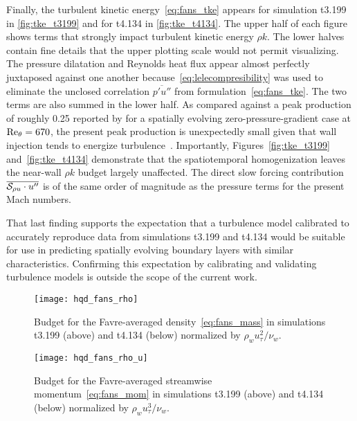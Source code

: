 Finally, the turbulent kinetic energy~\eqref{eq:fans_tke} appears for simulation
t3.199 in \autoref{fig:tke_t3199} and for t4.134 in \autoref{fig:tke_t4134}.
The upper half of each figure shows terms that strongly impact turbulent kinetic
energy $\rho k$.  The lower halves contain fine details that the upper plotting scale
would not permit visualizing.  The pressure dilatation and Reynolds heat
flux appear almost perfectly juxtaposed against one another because~\eqref{eq:lelecompresibility} was
used to eliminate the unclosed correlation $\overline{p'u''}$ from
formulation~\eqref{eq:fans_tke}.  The two terms are also summed in the lower
half.  As compared against a peak production of roughly 0.25 reported by
\citet{Schlatter2009Turbulent} for a spatially evolving zero-pressure-gradient
case at $\Reynolds[\theta]{}=670$, the present peak production is unexpectedly small
given that wall injection tends to energize
turbulence~\citep{Sumitani1995Direct}.
%
Importantly, Figures~\ref{fig:tke_t3199} and~\ref{fig:tke_t4134} demonstrate
that the \citet{Topalian2014Spatiotemporal} spatiotemporal homogenization
leaves the near-wall $\rho k$ budget largely unaffected.  The direct slow forcing
contribution $\overline{\Ssd_{\rho u}\cdot{}u^{\prime\prime}}$ is of the same
order of magnitude as the pressure terms for the present Mach numbers.

That last finding supports the expectation that a turbulence model calibrated to
accurately reproduce data from simulations t3.199 and t4.134 would be suitable
for use in predicting spatially evolving boundary layers with similar
characteristics.  Confirming this expectation by calibrating and validating
turbulence models is outside the scope of the current work.


\begin{figure}
\centering
\texttt{[image: hqd\_fans\_rho]}
\caption[Density equation budget for simulations t3.199 and t4.134]{%
    Budget for the Favre-averaged density~\eqref{eq:fans_mass}
    in simulations t3.199 (above) and t4.134 (below)
    normalized by $\rho_w u_\tau^2 / \nu_w$.\label{fig:fans_rho}
}
\end{figure}

\begin{figure}
\centering
\texttt{[image: hqd\_fans\_rho\_u]}
\caption[Streamwise momentum equation budget for cases t3.199 and t4.134]{%
    Budget for the Favre-averaged streamwise momentum~\eqref{eq:fans_mom}
    in simulations t3.199 (above) and t4.134 (below)
    normalized by $\rho_w u_\tau^3 / \nu_w$.\label{fig:fans_rho_u}
}
\end{figure}

